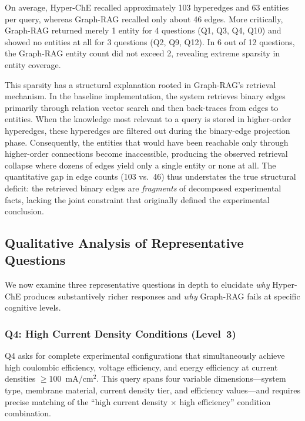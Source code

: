 \documentclass[11pt,a4paper]{article}
\begin{document}
On average, Hyper-ChE recalled approximately 103 hyperedges and 63 entities per query, whereas Graph-RAG recalled only about 46 edges. More critically, Graph-RAG returned merely 1 entity for 4 questions (Q1, Q3, Q4, Q10) and showed no entities at all for 3 questions (Q2, Q9, Q12). In 6 out of 12 questions, the Graph-RAG entity count did not exceed 2, revealing extreme sparsity in entity coverage.

This sparsity has a structural explanation rooted in Graph-RAG's retrieval mechanism. In the baseline implementation, the system retrieves binary edges primarily through relation vector search and then back-traces from edges to entities. When the knowledge most relevant to a query is stored in higher-order hyperedges, these hyperedges are filtered out during the binary-edge projection phase. Consequently, the entities that would have been reachable only through higher-order connections become inaccessible, producing the observed retrieval collapse where dozens of edges yield only a single entity or none at all. The quantitative gap in edge counts (103 vs.~46) thus understates the true structural deficit: the retrieved binary edges are \emph{fragments} of decomposed experimental facts, lacking the joint constraint that originally defined the experimental conclusion.

\subsection{Qualitative Analysis of Representative Questions}
\label{subsec:flow_battery_qualitative}

We now examine three representative questions in depth to elucidate \emph{why} Hyper-ChE produces substantively richer responses and \emph{why} Graph-RAG fails at specific cognitive levels.

\subsubsection{Q4: High Current Density Conditions (Level~3)}

Q4 asks for complete experimental configurations that simultaneously achieve high coulombic efficiency, voltage efficiency, and energy efficiency at current densities $\geq 100$~mA/cm$^2$. This query spans four variable dimensions---system type, membrane material, current density tier, and efficiency values---and requires precise matching of the ``high current density $\times$ high efficiency'' condition combination.
\end{document}

